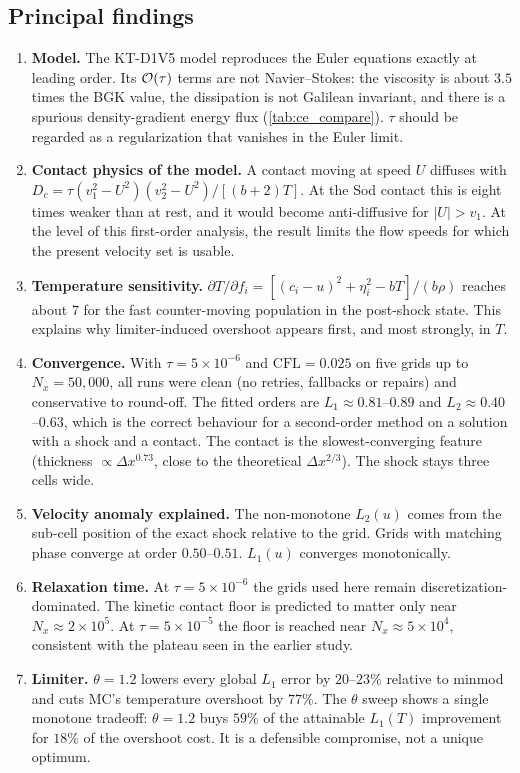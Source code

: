 \subsection{Principal findings}
\begin{enumerate}
  \item \textbf{Model.}  The KT-D1V5 model reproduces the Euler equations exactly at
        leading order.  Its $\mathcal{O}(\tau)$ terms are not Navier--Stokes: the viscosity is
        about $3.5$ times the BGK value, the dissipation is not Galilean invariant,
        and there is a spurious density-gradient energy flux (\cref{tab:ce_compare}).
        $\tau$ should be regarded as a regularization that vanishes in the Euler limit.
  \item \textbf{Contact physics of the model.}  A contact moving at speed $U$ diffuses
        with $D_c=\tau(v_1^2-U^2)(v_2^2-U^2)/[(b+2)T]$.  At the Sod contact this is
        eight times weaker than at rest, and it would become anti-diffusive for
        $|U|>v_1$.  At the level of this first-order analysis, the result limits the flow speeds
        for which the present velocity set is usable.
  \item \textbf{Temperature sensitivity.}  $\partial T/\partial f_i = [(c_i-u)^2+\eta_i^2-bT]/(b\rho)$
        reaches about $7$ for the fast counter-moving population in the post-shock
        state.  This explains why limiter-induced overshoot appears first, and most
        strongly, in $T$.
  \item \textbf{Convergence.}  With $\tau=5\times10^{-6}$ and $\mathrm{CFL}=0.025$ on five
        grids up to $N_x=50{,}000$, all runs were clean (no retries, fallbacks or
        repairs) and conservative to round-off.  The fitted orders are
        $L_1\approx0.81$--$0.89$ and $L_2\approx0.40$--$0.63$, which is the correct
        behaviour for a second-order method on a solution with a shock and a
        contact.  The contact is the slowest-converging feature
        (thickness $\propto\Delta x^{0.73}$, close to the theoretical $\Delta x^{2/3}$).
        The shock stays three cells wide.
  \item \textbf{Velocity anomaly explained.}  The non-monotone $L_2(u)$ comes from the
        sub-cell position of the exact shock relative to the grid.  Grids with
        matching phase converge at order $0.50$--$0.51$.  $L_1(u)$ converges
        monotonically.
  \item \textbf{Relaxation time.}  At $\tau=5\times10^{-6}$ the grids used here remain
        discretization-dominated.  The kinetic contact floor is predicted to matter
        only near $N_x\approx2\times10^5$.  At $\tau=5\times10^{-5}$ the floor is reached
        near $N_x\approx5\times10^4$, consistent with the plateau seen in the earlier
        study.
  \item \textbf{Limiter.}  $\theta=1.2$ lowers every global $L_1$ error by $20$--$23\%$
        relative to minmod and cuts MC's temperature overshoot by $77\%$.  The
        $\theta$ sweep shows a single monotone tradeoff: $\theta=1.2$ buys $59\%$ of the
        attainable $L_1(T)$ improvement for $18\%$ of the overshoot cost.  It is a
        defensible compromise, not a unique optimum.
\end{enumerate}

